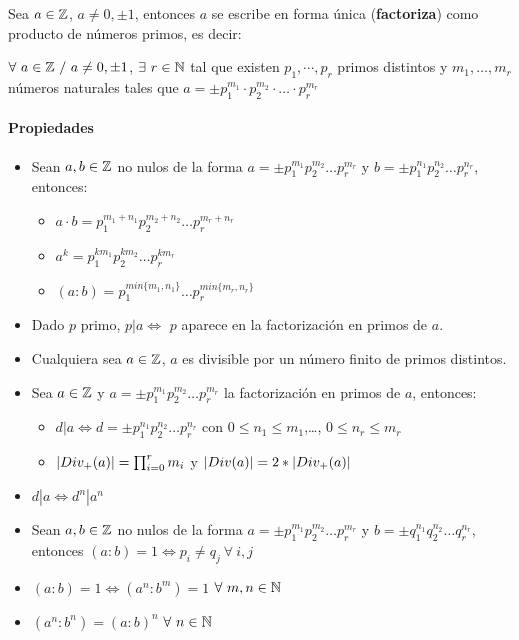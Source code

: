 Sea $a\in\mathbb{Z}$, $a\neq0,\pm 1$, entonces $a$ se escribe en forma única (\textbf{factoriza}) como producto de números primos, es decir:
\begin{center}
\begin{minipage}{0.8\textwidth}
$\forall~a\in\mathbb{Z}~/~a\neq0,\pm1$, $\exists~r\in\mathbb{N}$ tal que existen $p_1,\cdots,p_r$ primos distintos y $m_1,\dots,m_r$ números naturales tales que $a=\pm p_1^{m_1}\cdot p_2^{m_2}\cdot\dots\cdot p_r^{m_r}$
\end{minipage}
\end{center}

\paragraph{Propiedades}

\begin{itemize}
\item Sean $a,b\in\mathbb{Z}$ no nulos de la forma $a=\pm p_1^{m_1}p_2^{m_2}\dots p_r^{m_r}$ y $b=\pm p_1^{n_1}p_2^{n_2}\dots p_r^{n_r}$, entonces:
\begin{itemize}
\item $a\cdot b = p_1^{m_1+n_1}p_2^{m_2 + n_2}\dots p_r^{m_r + n_r}$
\item $a^k = p_1^{km_1}p_2^{km_2}\dots p_r^{km_r}$
\item $(a:b) = p_1^{min\{m_1,n_1\}}\dots p_r^{min\{m_r,n_r\}}$
\end{itemize}
\item Dado $p$ primo, $p|a\iff$ $p$ aparece en la factorización en primos de $a$.
\item Cualquiera sea $a\in\mathbb{Z}$, $a$ es divisible por un número finito de primos distintos.

\item Sea $a\in\mathbb{Z}$ y $a = \pm p_1^{m_1}p_2^{m_2}\dots p_r^{m_r}$ la factorización en primos de $a$, entonces:
\begin{itemize}
\item $d|a\iff d =\pm p_1^{n_1}p_2^{n_2}\dots p_r^{n_r}$ con $0\leq n_1 \leq m_1$,\dots, $0\leq n_r\leq m_r$
\item $|Div_{+}(a)| = \prod_{i=0}^{r} m_i$ y $|Div(a)| = 2*|Div_{+}(a)|$
\end{itemize}
\item $d|a \iff d^n|a^n$
\item Sean $a,b\in\mathbb{Z}$ no nulos de la forma $a=\pm p_1^{m_1}p_2^{m_2}\dots p_r^{m_r}$ y $b=\pm q_1^{n_1}q_2^{n_2}\dots q_r^{n_r}$, entonces $(a:b) = 1\iff p_i\neq q_j~\forall~i,j$
\item $(a:b) = 1 \iff (a^n : b^m) = 1$ $\forall~m,n\in\mathbb{N}$
\item $(a^n:b^n) = (a:b)^n$ $\forall~n\in\mathbb{N}$
\end{itemize}

